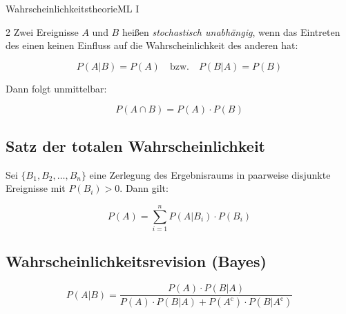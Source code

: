 \begin{formulaBox}{Wahrscheinlichkeitstheorie}{ML I}
\begin{multicols}{2}
Zwei Ereignisse $A$ und $B$ heißen \emph{stochastisch unabhängig}, wenn das Eintreten des einen keinen Einfluss auf die Wahrscheinlichkeit des anderen hat:

\[
P(A | B) = P(A)
\quad \text{bzw.} \quad
P(B | A) = P(B)
\]

Dann folgt unmittelbar:

\[
P(A \cap B) = P(A) \cdot P(B)
\]

\subsection*{Satz der totalen Wahrscheinlichkeit}

Sei $\{B_1, B_2, \dots, B_n\}$ eine Zerlegung des Ergebnisraums in paarweise disjunkte Ereignisse mit $P(B_i) > 0$. Dann gilt:

\[
P(A) = \sum_{i=1}^n P(A | B_i) \cdot P(B_i)
\]

\subsection*{Wahrscheinlichkeitsrevision (Bayes)}

\[
P(A | B) = \frac{P(A) \cdot P(B | A)}{P(A) \cdot P(B | A) + P(A^{\mathrm{c}}) \cdot P(B | A^{\mathrm{c}})}
\]

\end{multicols}
\end{formulaBox}
